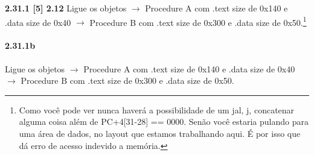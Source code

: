\documentclass{article}
\begin{document}
\textbf{2.31.1 [5] 2.12} Ligue os objetos $\rightarrow$ Procedure A com .text
size de 0x140 e .data size de 0x40 $\rightarrow$ Procedure B com .text size de
0x300 e .data size de 0x50.\footnote{Como você pode ver nunca haverá a
possibilidade de um jal, j, concatenar alguma coisa além de \textsc{PC+4[31-28]
== 0000}. Senão você estaria pulando para uma área de dados, no layout que
estamos trabalhando aqui. É por isso que dá erro de acesso indevido a memória.}


\paragraph{2.31.1b} Ligue os objetos $\rightarrow$ Procedure A com .text
size de 0x140 e .data size de 0x40 $\rightarrow$ Procedure B com .text size de
0x300 e .data size de 0x50.
\end{document}
